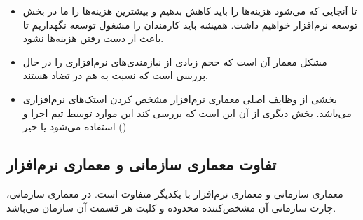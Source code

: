 \documentclass[a4paper]{article}
\begin{document}
\begin{itemize}
    \item تا آنجایی که می‌شود هزینه‌ها را باید کاهش بدهیم و بیشترین هزینه‌ها را
    ما در بخش توسعه نرم‌افزار خواهیم داشت. همیشه باید کارمندان را مشغول توسعه
    نگهداریم تا باعث از دست رفتن هزینه‌ها نشود.
    \item مشکل معمار آن است که حجم زیادی از نیازمندی‌های نرم‌افزاری را در حال
    بررسی است که نسبت به هم در تضاد هستند.
    \item بخشی از وظایف اصلی معماری نرم‌افزار مشخص کردن استک‌های نرم‌افزاری
    می‌باشد. بخش دیگری از آن این است که بررسی کند این موارد توسط تیم اجرا و
    استفاده می‌شود یا خیر ()
\end{itemize}

\subsection{تفاوت معماری سازمانی و معماری نرم‌افزار}

معماری سازمانی و معماری نرم‌افزار با یکدیگر متفاوت است. در معماری سازمانی، چارت
سازمانی آن مشخص‌کننده محدوده و کلیت هر قسمت آن سازمان می‌باشد.





\newpage


\end{document}
